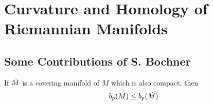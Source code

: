 \section{Curvature and Homology of Riemannian Manifolds}
\subsection{Some Contributions of S. Bochner}

\begin{prop}

If $ \Tilde{M}$ is a covering manifold of $M$ which is also compact, then
\[
	b_p(M) \leq b_p( \Tilde{M})
\]


\end{prop}

